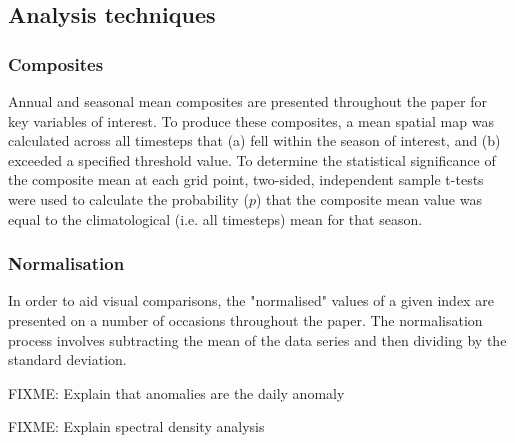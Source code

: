 \subsection{Analysis techniques}

\subsubsection{Composites}
Annual and seasonal mean composites are presented throughout the paper for key variables of interest. To produce these composites, a mean spatial map was calculated across all timesteps that (a) fell within the season of interest, and (b) exceeded a specified threshold value. To determine the statistical significance of the composite mean at each grid point, two-sided, independent sample t-tests were used to calculate the probability ($p$) that the composite mean value was equal to the climatological (i.e. all timesteps) mean for that season.    

\subsubsection{Normalisation}
In order to aid visual comparisons, the "normalised" values of a given index are presented on a number of occasions throughout the paper. The normalisation process involves subtracting the mean of the data series and then dividing by the standard deviation. 

FIXME: Explain that anomalies are the daily anomaly

FIXME: Explain spectral density analysis